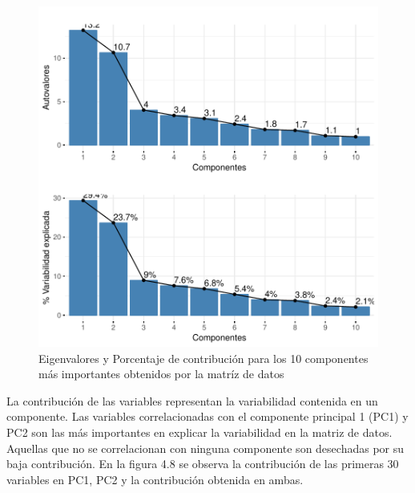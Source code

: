 \documentclass[a4paper,12pt]{Latex/Classes/PhDthesisPSnPDF}
\begin{document}
\begin{figure}[H]
\centering
\includegraphics{main-013}
\caption{Eigenvalores y Porcentaje de contribución para los 10 componentes más importantes obtenidos por la matríz de datos}
\end{figure}

La contribución de las variables representan la variabilidad contenida en un componente. Las variables correlacionadas con el componente principal 1 (PC1) y PC2 son las más importantes en explicar la variabilidad en la matriz de datos. Aquellas que no se correlacionan con ninguna componente son desechadas por su baja contribución. En la figura 4.8 se observa la contribución de las primeras 30 variables en PC1, PC2 y la contribución obtenida en ambas.
\end{document}
